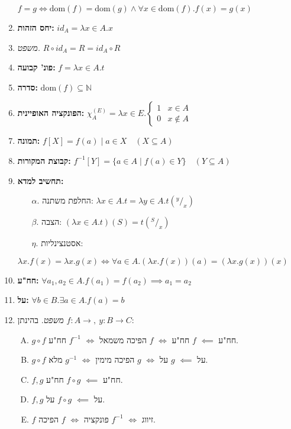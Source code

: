 \documentclass[]{article}
\newcommand\N     {\mathbb{N}}
\newcommand\dom   {\mathrm{dom}}
\newcommand\op    {^{-1}}
\newcommand\tho       {\textit{משפט. }}
\newcommand\tiff      {\!\iff\!}
\begin{document}
\begin{multicols}{2}
\begin{enumerate}[resume]
				\hfill $ f = g \iff \dom(f) = \dom(g) \land \forall x \in \dom(f). f(x) = g(x) $
			\item \textbf{יחס הזהות: }\hfill $id_A = \lambda x \in A. x$
			\item \tho \hfill $R \circ id_A = R = id_A \circ R$
			\item \textbf{פונ' קבועה: }\hfill $f = \lambda x \in A. t$
			\item \textbf{סדרה: }\hfill $\dom(f) \subseteq \N$
			\item \textbf{הפונקציה האופיינית: }
			\hfill $ \chi_A^{(E)} = \lambda x \in E. \begin{cases}
				1 & x\in A \\
				0 & x \notin A
			\end{cases} $
			\item \textbf{תמונה: }\hfill$f[X] = f(a) \mid a \in X \quad (X \subseteq A)$
			\item \textbf{קבוצת המקורות: }\hfill$f\op[Y] = \{a \in A \mid f(a) \in Y\} \quad (Y \subseteq A)$
			\item \textbf{תחשיב למדא: }
			\begin{enumerate}
				\item[$\alpha$.] החלפת משתנה: \hfill $\lambda x \in A. t = \lambda y \in A. t(^y/_x)$
				\item[$\beta$.] הצבה: \hfill $(\lambda x \in A. t)(S) = t(^S/_x)$
				\item[$\eta$.] אסטנצינליות: 
			\end{enumerate}
				\hfill $ \lambda x. f(x) = \lambda x. g(x) \tiff \forall a \in A. (\lambda x. f(x))(a) = (\lambda x. g(x))(x) $
			\item \textbf{חח"ע: }\hfill $\forall a_1, a_2 \in A. f(a_1) = f(a_2) \implies a_1 = a_2$
			\item \textbf{על: }\hfill $\forall b \in B. \exists a \in A. f(a) = b$
			\item \tho בהינתן $f \colon A \to , \ y \colon B \to C$: 
			\begin{enumerate}[A)]
				\item $g \circ f$ חח"ע $\impliedby$ $f$ חח"ע $\iff $ $f$ הפיכה משמאל $\iff$ $f\op$ חח"ע. 
				\item $g \circ f$ על $\impliedby $ $g$ על $\iff$ $g$ הפיכה מימין $\iff$ $g\op$ מלא. 
				\item $f, g$ חח"ע $\impliedby$ $f \circ g$ חח"ע. 
				\item $f, g$ על $\impliedby$ $f \circ g$ על. 
				\item $f$ זיווג $\iff$ $f\op$ פונקציה $\iff$ $f$ הפיכה. 

\end{enumerate}
\end{enumerate}
\end{multicols}
\end{document}
